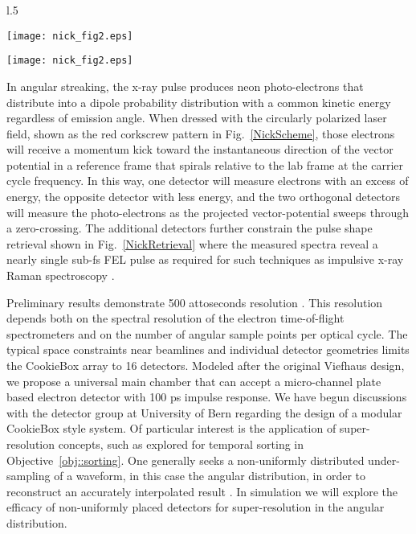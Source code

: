 \documentclass[letterpaper,oneside,11pt]{article}
\begin{document}
\begin{wrapfigure}[20]{l}{.5\linewidth}
\vspace{-\baselineskip}
\centerline{\texttt{[image: nick\_fig2.eps]}}
\centerline{\texttt{[image: nick\_fig2.eps]}}
\vspace{-1\baselineskip}
\caption{\label{NickRetrieval}X-ray pulse shape retrieval from our recent angular streaking measurement at LCLS \cite{Nick2016}.}
\end{wrapfigure}

In angular streaking, the x-ray pulse produces neon photo-electrons that distribute into a dipole probability distribution with a common kinetic energy regardless of emission angle.
When dressed with the circularly polarized laser field, shown as the red corkscrew pattern in Fig.~\ref{NickScheme}, those electrons will receive a momentum kick toward the instantaneous direction of the vector potential in a reference frame that spirals relative to the lab frame at the carrier cycle frequency.
In this way, one detector will measure electrons with an excess of energy, the opposite detector with less energy, and the two orthogonal detectors will measure the photo-electrons as the projected vector-potential sweeps through a zero-crossing.
The additional detectors further constrain the pulse shape retrieval shown in Fig.~\ref{NickRetrieval} where the measured spectra reveal a nearly single sub-fs FEL pulse as required for such techniques as impulsive x-ray Raman spectroscopy \cite{TIGER2015}.

Preliminary results demonstrate 500 attoseconds resolution \cite{Nick2016}.
This resolution depends both on the spectral resolution of the electron time-of-flight spectrometers and on the number of angular sample points per optical cycle.
The typical space constraints near beamlines and individual detector geometries limits the CookieBox array to 16 detectors. %
Modeled after the original Viefhaus design, we propose a universal main chamber that can accept a micro-channel plate based electron detector with 100 ps impulse response.
We have begun discussions with the detector group at University of Bern regarding the design of a modular CookieBox style system.
Of particular interest is the application of super-resolution concepts, such as explored for temporal sorting in Objective~\ref{obj::sorting}.
One generally seeks a non-uniformly distributed under-sampling of a waveform, in this case the angular distribution, in order to reconstruct an accurately interpolated result \cite{Candes2004a,Candes2004b,Candes2005,Elad2006}. 
In simulation we will explore the efficacy of non-uniformly placed detectors for super-resolution in the angular distribution.
\end{document}
